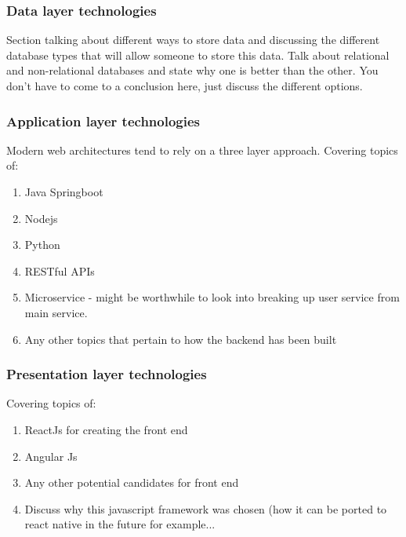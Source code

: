\subsubsection{Data layer technologies}
Section talking about different ways to store data and discussing the different database types
that will allow someone to store this data. Talk about relational and non-relational databases and
state why one is better than the other. You don't have to come to a conclusion here, just discuss
the different options.

\subsubsection{Application layer technologies}
Modern web architectures tend to rely on a three layer approach. 
Covering topics of:
\begin{enumerate}
    \item Java Springboot
    \item Nodejs
    \item Python
    \item RESTful APIs
    \item Microservice - might be worthwhile to look into breaking up user service from main service.
    \item Any other topics that pertain to how the backend has been built
\end{enumerate}


\subsubsection{Presentation layer technologies}
Covering topics of:
\begin{enumerate}
    \item ReactJs for creating the front end
    \item Angular Js 
    \item Any other potential candidates for front end
    \item Discuss why this javascript framework was chosen (how it can be ported to react native in the future for example...
\end{enumerate}



